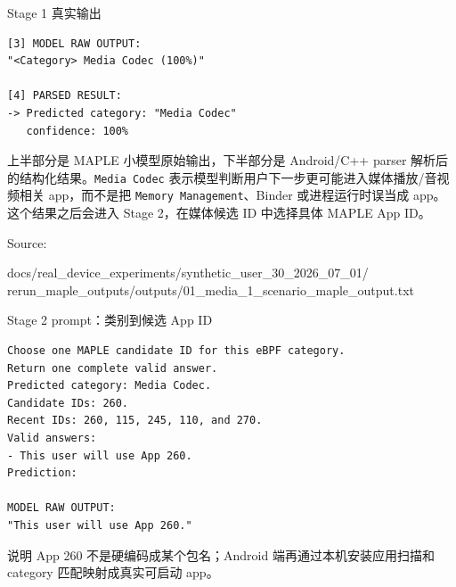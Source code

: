 \documentclass[UTF8,aspectratio=169,10pt]{ctexbeamer}
\newcommand{\code}[1]{\texttt{\small #1}}
\newcommand{\sourcefoot}[1]{%
  \vfill
  {\scriptsize\textcolor{memoGray}{Source: }%
  \parbox[t]{0.84\textwidth}{\raggedright\ttfamily\scriptsize #1}}%
}
\newcommand{\explainfoot}[1]{%
  \vspace{0.35em}
  {\scriptsize\color{memoGray}#1}
}
\begin{document}
\begin{frame}[fragile]{Stage 1 真实输出}
\begin{lstlisting}
[3] MODEL RAW OUTPUT:
"<Category> Media Codec (100%)"

[4] PARSED RESULT:
-> Predicted category: "Media Codec"
   confidence: 100%
\end{lstlisting}
  \explainfoot{上半部分是 MAPLE 小模型原始输出，下半部分是 Android/C++ parser 解析后的结构化结果。\code{Media Codec} 表示模型判断用户下一步更可能进入媒体播放/音视频相关 app，而不是把 \code{Memory Management}、Binder 或进程运行时误当成 app。这个结果之后会进入 Stage 2，在媒体候选 ID 中选择具体 MAPLE App ID。}
  \sourcefoot{docs/real\_device\_experiments/synthetic\_user\_30\_2026\_07\_01/\\rerun\_maple\_outputs/outputs/01\_media\_1\_scenario\_maple\_output.txt}
\end{frame}

\begin{frame}[fragile]{Stage 2 prompt：类别到候选 App ID}
\begin{lstlisting}
Choose one MAPLE candidate ID for this eBPF category.
Return one complete valid answer.
Predicted category: Media Codec.
Candidate IDs: 260.
Recent IDs: 260, 115, 245, 110, and 270.
Valid answers:
- This user will use App 260.
Prediction:

MODEL RAW OUTPUT:
"This user will use App 260."
\end{lstlisting}
  \begin{block}{说明}
    App 260 不是硬编码成某个包名；Android 端再通过本机安装应用扫描和 category 匹配映射成真实可启动 app。
  \end{block}
\end{frame}
\end{document}
